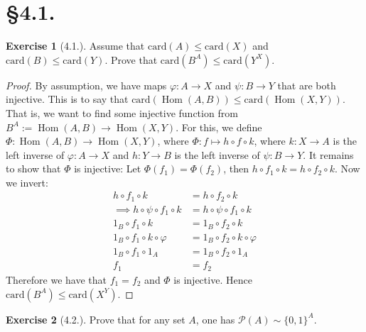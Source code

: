 \documentclass[9pt,reqno]{amsart}
\theoremstyle{definition}
\newtheorem{exercise}{Exercise}[section]
\DeclareMathOperator{\Hom}{Hom}
\begin{document}
\section{\S 4.1.}

\begin{exercise}[4.1.] Assume that $\text{card}(A) \leq  \text{card}(X)$ and $\text{card}(B) \leq \text{card}(Y)$. Prove that $\text{card}(B^A) \leq  \text{card}(Y^X)$. 
\end{exercise}

\begin{proof}
	By assumption, we have maps $\varphi \colon A \to X$ and $\psi \colon B \to Y$ that are both injective. This is to say that $ \text{card} (\Hom (A, B)) \leq \text{card} (\Hom (X, Y))$. That is, we want to find some injective function from $B^A := \Hom (A, B) \to \Hom (X, Y)$. For this, we define $\Phi \colon \Hom (A, B) \to \Hom (X, Y)$, where $\Phi \colon f \mapsto h \circ f \circ k$, where $k \colon X \to A$ is the left inverse of $\varphi \colon A \to X$ and $h \colon Y \to B$ is the left inverse of $\psi \colon B \to Y$. It remains to show that $\Phi$ is injective: Let $\Phi (f_1) = \Phi (f_2)$, then $h \circ f_1 \circ k  = h \circ f_2 \circ k$. Now we invert:
	\begin{align*}
	h \circ f_1 \circ k  &= h \circ f_2 \circ k \\ 
		\implies h \circ \psi \circ f_1 \circ k &= h \circ \psi \circ f_1 \circ k \\
		1_B \circ f_1 \circ k &= 1_B \circ f_2 \circ  k \\
		1_B \circ f_1 \circ k \circ \varphi &= 1_B \circ f_2 \circ k \circ \varphi \\
		1_B \circ f_1 \circ 1_A &= 1_B \circ f_2 \circ 1_A \\
		f_1 &= f_2
	\end{align*}
	Therefore we have that $f_1 = f_2$ and $\Phi$ is injective. Hence $\text{card} (B^A) \leq \text{card} (X^Y)$.
	\end{proof}
\begin{exercise}[4.2.]  Prove that for any set $A$, one has $\mathcal P (A) \sim  \{0, 1\}^A$. 
\end{exercise}
\end{document}
